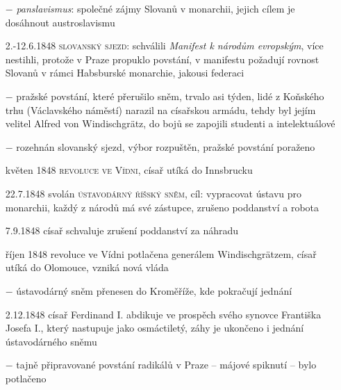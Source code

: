 \documentclass{article}
\begin{document}
\begin{itemize}
    \item[$-$] \textit{panslavismus}: společné zájmy Slovanů v monarchii, jejich cílem je dosáhnout austroslavismu
    \item[2.-12.6.1848] \textsc{slovanský sjezd}: schválili \textit{Manifest k národům evropským}, více nestihli, protože v Praze propuklo povstání, v manifestu požadují rovnost Slovanů v rámci Habsburské monarchie, jakousi federaci
    \item[$-$] pražské povstání, které přerušilo sněm, trvalo asi týden, lidé z Koňského trhu (Václavského náměstí) narazil na císařskou armádu, tehdy byl jejím velitel Alfred von Windischgrätz, do bojů se zapojili studenti a intelektuálové
    \item[$-$] rozehnán slovanský sjezd, výbor rozpuštěn, pražské povstání poraženo
    \item[květen 1848] \textsc{revoluce ve Vídni}, císař utíká do Innsbrucku
    \item[22.7.1848] svolán \textsc{ústavodárný říšský sněm}, cíl: vypracovat ústavu pro monarchii, každý z národů má své zástupce, zrušeno poddanství a robota
    \item[7.9.1848] císař schvaluje zrušení poddanství za náhradu
    \item[říjen 1848] revoluce ve Vídni potlačena generálem Windischgrätzem, císař utíká do Olomouce, vzniká nová vláda
    \item[$-$] ústavodárný sněm přenesen do Kroměříže, kde pokračují jednání
    \item[2.12.1848] císař Ferdinand I. abdikuje ve prospěch svého synovce Františka Josefa I., který nastupuje jako osmáctiletý, záhy je ukončeno i jednání ústavodárného sněmu
    \item[$-$] tajně připravované povstání radikálů v Praze -- májové spiknutí -- bylo potlačeno
\end{itemize}
\end{document}
